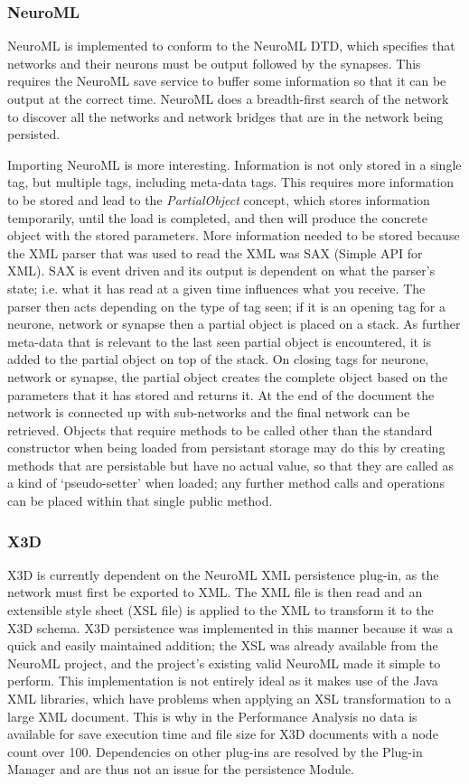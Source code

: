\documentclass{acm_proc_article-sp}
\begin{document}
\subsubsection{NeuroML}
{
NeuroML is implemented to conform to the NeuroML DTD, which specifies that networks and their neurons must be output followed by the synapses. This requires the NeuroML save service to buffer some information so that it can be output at the correct time. NeuroML does a breadth{}-first search of the network to discover all the networks and network bridges that are in the network being persisted.

Importing NeuroML is more interesting. Information is not only stored in a single tag, but multiple tags, including meta{}-data tags. This requires more information to be stored and lead to the {\itshape PartialObject} concept, which stores information temporarily, until the load is completed, and then will produce the concrete object with the stored parameters. More information needed to be stored because the XML parser that was used to read the XML was SAX (Simple API for XML)\cite{sax}. SAX is event driven and its output is dependent on what the parser's state; i.e. what it has read at a given time influences what you receive. The parser then acts depending on the type of tag seen; if it is an opening tag for a neurone, network or synapse then a partial object is placed on a stack. As further meta{}-data that is relevant to the last seen partial object  is encountered, it is added to the partial object on top of the stack. On closing tags for neurone, network or synapse, the partial object creates the complete object based on the parameters that it has stored and returns it. At the end of the document the network is connected up with sub{}-networks and the final network can be retrieved. Objects that require methods to be called other than the standard constructor when being loaded from persistant storage may do this by creating methods that are persistable but have no actual value, so that they are called as a kind of `pseudo-setter' when loaded; any further method calls and operations can be placed within that single public method.
} 
\subsubsection{X3D}
{
X3D is currently dependent on the NeuroML XML persistence plug{}-in, as the network must first be exported to XML. The XML file is then read and an extensible style sheet (XSL file) is applied to the XML to transform it to the X3D schema. X3D persistence was implemented in this manner because it was a quick and easily maintained addition; the XSL was already available from the NeuroML project\cite{x3dxsl}, and the project's existing valid NeuroML made it simple to perform. This implementation is not entirely ideal as it makes use of the Java XML libraries\cite{java:xsl}, which have problems when applying an XSL transformation to a large XML document. This is why in the Performance Analysis no data is available for save execution time and file size for X3D documents with a node count over 100. Dependencies on other plug{}-ins are resolved by the Plug{}-in Manager and are thus not an issue for the persistence Module.
}
\end{document}
